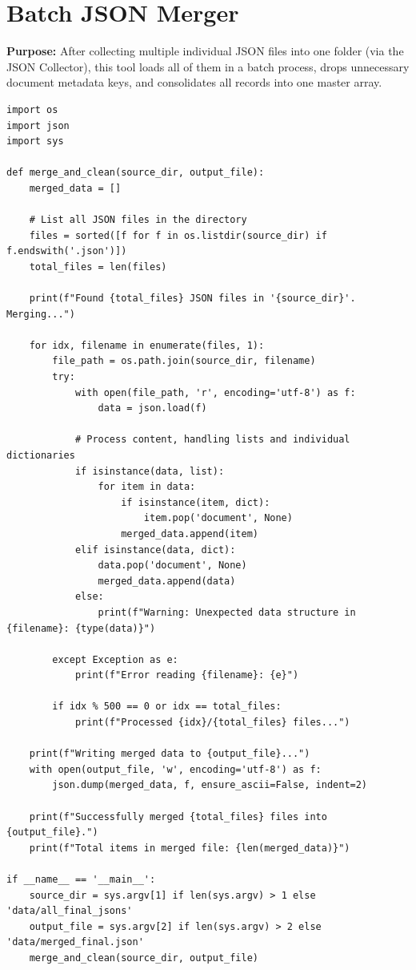 \documentclass[11pt]{article}
\begin{document}
\section{Batch JSON Merger} \label{sec:batchmerger}
\textbf{Purpose:} After collecting multiple individual JSON files into one folder (via the JSON Collector), this tool loads all of them in a batch process, drops unnecessary document metadata keys, and consolidates all records into one master array.

\begin{lstlisting}[style=pythoncode, caption={batch\_merger.py}]
import os
import json
import sys

def merge_and_clean(source_dir, output_file):
    merged_data = []
    
    # List all JSON files in the directory
    files = sorted([f for f in os.listdir(source_dir) if f.endswith('.json')])
    total_files = len(files)
    
    print(f"Found {total_files} JSON files in '{source_dir}'. Merging...")
    
    for idx, filename in enumerate(files, 1):
        file_path = os.path.join(source_dir, filename)
        try:
            with open(file_path, 'r', encoding='utf-8') as f:
                data = json.load(f)
                
            # Process content, handling lists and individual dictionaries
            if isinstance(data, list):
                for item in data:
                    if isinstance(item, dict):
                        item.pop('document', None)
                    merged_data.append(item)
            elif isinstance(data, dict):
                data.pop('document', None)
                merged_data.append(data)
            else:
                print(f"Warning: Unexpected data structure in {filename}: {type(data)}")
                
        except Exception as e:
            print(f"Error reading {filename}: {e}")
            
        if idx % 500 == 0 or idx == total_files:
            print(f"Processed {idx}/{total_files} files...")
            
    print(f"Writing merged data to {output_file}...")
    with open(output_file, 'w', encoding='utf-8') as f:
        json.dump(merged_data, f, ensure_ascii=False, indent=2)
        
    print(f"Successfully merged {total_files} files into {output_file}.")
    print(f"Total items in merged file: {len(merged_data)}")

if __name__ == '__main__':
    source_dir = sys.argv[1] if len(sys.argv) > 1 else 'data/all_final_jsons'
    output_file = sys.argv[2] if len(sys.argv) > 2 else 'data/merged_final.json'
    merge_and_clean(source_dir, output_file)
\end{lstlisting}
\end{document}
